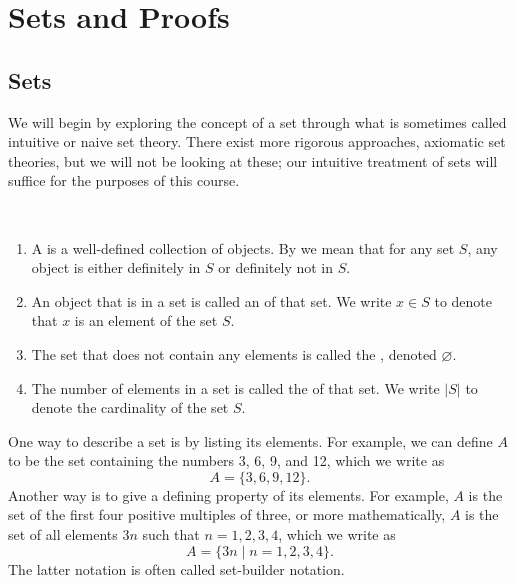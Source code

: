 \chapter{Sets and Proofs}\label{chap:sets_proofs}

\section{Sets}

We will begin by exploring the concept of a set through what is sometimes called intuitive or naive set theory. There exist more rigorous approaches, axiomatic set theories, but we will not be looking at these; our intuitive treatment of sets will suffice for the purposes of this course.

\begin{definition}~
\begin{enumerate}
    \item A  is a well-defined collection of objects. By  we mean that for any set $ S $, any object is either definitely in $ S $ or definitely not in $ S $.
    \item An object that is in a set is called an  of that set. We write $ x\in S $ to denote that $ x $ is an element of the set $ S $.
    \item The set that does not contain any elements is called the , denoted $ \varnothing $.
    \item The number of elements in a set is called the  of that set. We write $ \lvert S\rvert $ to denote the cardinality of the set $ S $.
\end{enumerate}
\end{definition}

One way to describe a set is by listing its elements. For example, we can define $ A $ to be the set containing the numbers 3, 6, 9, and 12, which we write as
\begin{equation*}
    A=\{3,6,9,12\}.
\end{equation*}
Another way is to give a defining property of its elements. For example, $ A $ is the set of the first four positive multiples of three, or more mathematically, $ A $ is the set of all elements $ 3n $ such that $ n=1,2,3,4 $, which we write as
\begin{equation*}
    A=\{3n\mid n=1,2,3,4\}.
\end{equation*}
The latter notation is often called set-builder notation.

